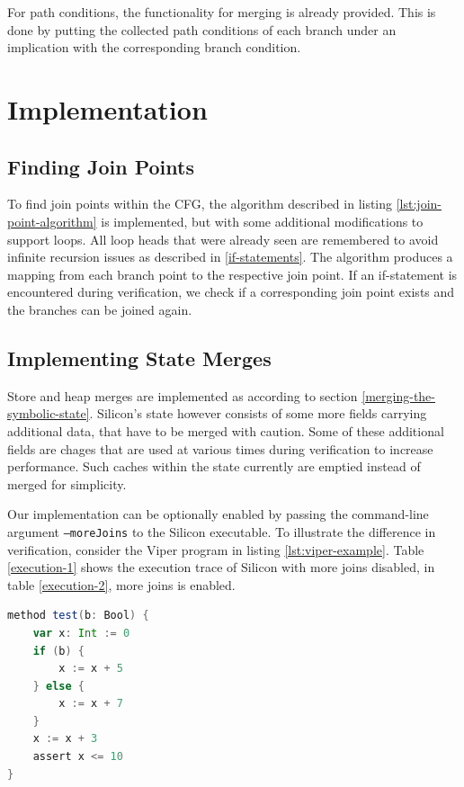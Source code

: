 \documentclass[11pt]{article}
\begin{document}
    For path conditions, the functionality for merging is already provided.
    This is done by putting the collected path conditions of each branch
    under an implication with the corresponding branch condition.

    \newpage
    \section{Implementation}

    \subsection{Finding Join Points}

    To find join points within the CFG, the algorithm described in listing \ref{lst:join-point-algorithm} is implemented,
    but with some additional modifications to support loops. All loop heads that
    were already seen are remembered to avoid infinite recursion issues as described
    in \ref{if-statements}.
    The algorithm produces a mapping from each branch point to the respective join point.
    If an if-statement is encountered during verification, we check if a 
    corresponding join point exists and the branches can be joined again.

    \subsection{Implementing State Merges} \label{implementing-state-merges}

    Store and heap merges are implemented as according to section \ref{merging-the-symbolic-state}.
    Silicon's state however consists of some more fields carrying additional data, that have to be merged with caution.
    Some of these additional fields are chages that are used at various times during verification
    to increase performance.
    Such caches within the state currently are emptied instead of merged for simplicity.

    Our implementation can be optionally enabled by passing the command-line
    argument \texttt{--moreJoins} to the Silicon executable. To illustrate the difference
    in verification, consider the Viper program in listing \ref{lst:viper-example}.
    Table \ref{execution-1} shows the execution trace of Silicon with more joins disabled,
    in table \ref{execution-2}, more joins is enabled.

    \begin{lstlisting}[language=Scala, caption={An example Viper program.}, label={lst:viper-example}]
method test(b: Bool) {
    var x: Int := 0
    if (b) {
        x := x + 5
    } else {
        x := x + 7
    }
    x := x + 3
    assert x <= 10
}       
    \end{lstlisting}
\end{document}

